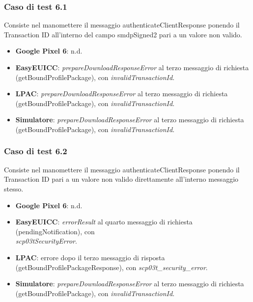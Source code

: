 \documentclass[10pt, oneside]{book}
\begin{document}
\subsubsection{Caso di test 6.1}
Consiste nel manomettere il messaggio authenticateClientResponse ponendo il Transaction ID all'interno del campo smdpSigned2 pari a un valore non valido.
\begin{itemize}
\item \textbf{Google Pixel 6}: n.d.
\item \textbf{EasyEUICC}: \textit{prepareDownloadResponseError} al terzo messaggio di richiesta (getBoundProfilePackage), con \textit{invalidTransactionId}.
\item \textbf{LPAC}: \textit{prepareDownloadResponseError} al terzo messaggio di richiesta (getBoundProfilePackage), con \textit{invalidTransactionId}.
\item \textbf{Simulatore}: \textit{prepareDownloadResponseError} al terzo messaggio di richiesta (getBoundProfilePackage), con \textit{invalidTransactionId}.
\end{itemize}

\subsubsection{Caso di test 6.2}
Consiste nel manomettere il messaggio authenticateClientResponse ponendo il Transaction ID pari a un valore non valido direttamente all’interno messaggio stesso.
\begin{itemize}
\item \textbf{Google Pixel 6}: n.d.
\item \textbf{EasyEUICC}: \textit{errorResult} al quarto messaggio di richiesta (pendingNotification), con\\ \textit{scp03tSecurityError}.
\item \textbf{LPAC}: errore dopo il terzo messaggio di risposta (getBoundProfilePackageResponse), con \textit{scp03t\_security\_error}.
\item \textbf{Simulatore}: \textit{prepareDownloadResponseError} al terzo messaggio di richiesta (getBoundProfilePackage), con \textit{invalidTransactionId}.
\end{itemize}
\end{document}
